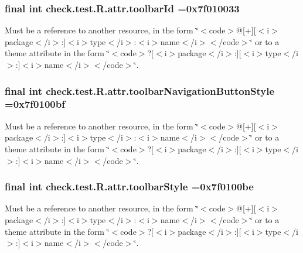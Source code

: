 \subsubsection[{toolbar\+Id}]{\setlength{\rightskip}{0pt plus 5cm}final int check.\+test.\+R.\+attr.\+toolbar\+Id =0x7f010033\hspace{0.3cm}{\ttfamily [static]}}\label{classcheck_1_1test_1_1_r_1_1attr_a115881f8837d9e7f7a0d617a81e74f0a}
Must be a reference to another resource, in the form \char`\"{}$<$code$>$@\mbox{[}+\mbox{]}\mbox{[}$<$i$>$package$<$/i$>$\+:\mbox{]}$<$i$>$type$<$/i$>$\+:$<$i$>$name$<$/i$>$$<$/code$>$\char`\"{} or to a theme attribute in the form \char`\"{}$<$code$>$?\mbox{[}$<$i$>$package$<$/i$>$\+:\mbox{]}\mbox{[}$<$i$>$type$<$/i$>$\+:\mbox{]}$<$i$>$name$<$/i$>$$<$/code$>$\char`\"{}. \hypertarget{classcheck_1_1test_1_1_r_1_1attr_abfae1004d8b4a81e368178f12eff90f7}{}
\subsubsection[{toolbar\+Navigation\+Button\+Style}]{\setlength{\rightskip}{0pt plus 5cm}final int check.\+test.\+R.\+attr.\+toolbar\+Navigation\+Button\+Style =0x7f0100bf\hspace{0.3cm}{\ttfamily [static]}}\label{classcheck_1_1test_1_1_r_1_1attr_abfae1004d8b4a81e368178f12eff90f7}
Must be a reference to another resource, in the form \char`\"{}$<$code$>$@\mbox{[}+\mbox{]}\mbox{[}$<$i$>$package$<$/i$>$\+:\mbox{]}$<$i$>$type$<$/i$>$\+:$<$i$>$name$<$/i$>$$<$/code$>$\char`\"{} or to a theme attribute in the form \char`\"{}$<$code$>$?\mbox{[}$<$i$>$package$<$/i$>$\+:\mbox{]}\mbox{[}$<$i$>$type$<$/i$>$\+:\mbox{]}$<$i$>$name$<$/i$>$$<$/code$>$\char`\"{}. \hypertarget{classcheck_1_1test_1_1_r_1_1attr_acbe9493c0eb16a5b6b5149aab310f271}{}
\subsubsection[{toolbar\+Style}]{\setlength{\rightskip}{0pt plus 5cm}final int check.\+test.\+R.\+attr.\+toolbar\+Style =0x7f0100be\hspace{0.3cm}{\ttfamily [static]}}\label{classcheck_1_1test_1_1_r_1_1attr_acbe9493c0eb16a5b6b5149aab310f271}
Must be a reference to another resource, in the form \char`\"{}$<$code$>$@\mbox{[}+\mbox{]}\mbox{[}$<$i$>$package$<$/i$>$\+:\mbox{]}$<$i$>$type$<$/i$>$\+:$<$i$>$name$<$/i$>$$<$/code$>$\char`\"{} or to a theme attribute in the form \char`\"{}$<$code$>$?\mbox{[}$<$i$>$package$<$/i$>$\+:\mbox{]}\mbox{[}$<$i$>$type$<$/i$>$\+:\mbox{]}$<$i$>$name$<$/i$>$$<$/code$>$\char`\"{}. \hypertarget{classcheck_1_1test_1_1_r_1_1attr_a96007b76e63444b819a9c38ff1451df1}{}
